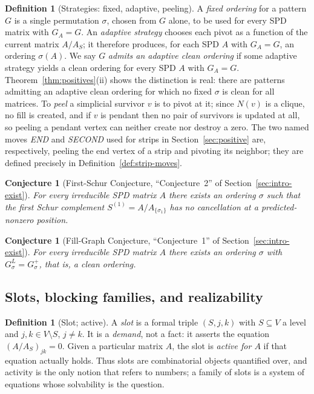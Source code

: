 \documentclass[11pt]{article}
\theoremstyle{plain}
\newtheorem{conjecture}[theorem]{Conjecture}
\theoremstyle{definition}
\newtheorem{definition}[theorem]{Definition}
\begin{document}
\begin{aiblock}
\begin{definition}[Strategies: fixed, adaptive, peeling]\label{def:strategy}
A \emph{fixed ordering} for a pattern $G$ is a single permutation $\sigma$, chosen from $G$ alone, to
be used for every SPD matrix with $G_A=G$. An \emph{adaptive strategy} chooses each pivot as a
function of the current matrix $A/A_S$; it therefore produces, for each SPD $A$ with $G_A=G$, an
ordering $\sigma(A)$. We say $G$ \emph{admits an adaptive clean ordering} if some adaptive strategy
yields a clean ordering for every SPD $A$ with $G_A=G$. Theorem~\ref{thm:positives}(ii) shows the
distinction is real: there are patterns admitting an adaptive clean ordering for which no fixed
$\sigma$ is clean for all matrices. To \emph{peel} a simplicial survivor $v$ is to pivot at it; since
$N(v)$ is a clique, no fill is created, and if $v$ is pendant then no pair of survivors is updated at
all, so peeling a pendant vertex can neither create nor destroy a zero. The two named moves
\emph{END} and \emph{SECOND} used for strips in Section~\ref{sec:positive} are, respectively, peeling
the end vertex of a strip and pivoting its neighbor; they are defined precisely in
Definition~\ref{def:strip-moves}.
\end{definition}

\begin{conjecture}[First-Schur Conjecture, ``Conjecture~2'' of Section~\ref{sec:intro-exist}]\label{conj:2}
For every irreducible SPD matrix $A$ there exists an ordering $\sigma$ such that the first Schur
complement $S^{(1)}=A/A_{\{\sigma_1\}}$ has no cancellation at a predicted-nonzero position.
\end{conjecture}

\begin{conjecture}[Fill-Graph Conjecture, ``Conjecture~1'' of Section~\ref{sec:intro-exist}]\label{conj:1}
For every irreducible SPD matrix $A$ there exists an ordering $\sigma$ with $G^L_\sigma=G^+_\sigma$,
that is, a clean ordering.
\end{conjecture}

\subsection{Slots, blocking families, and realizability}

\begin{definition}[Slot; active]\label{def:slots}
A \emph{slot} is a formal triple $(S,j,k)$ with $S\subseteq V$ a level and $j,k\in V\setminus S$,
$j\neq k$. It is a \emph{demand}, not a fact: it asserts the equation $(A/A_S)_{jk}=0$. Given a
particular matrix $A$, the slot is \emph{active for $A$} if that equation actually holds. Thus slots
are combinatorial objects quantified over, and activity is the only notion that refers to numbers; a
family of slots is a system of equations whose solvability is the question.
\end{definition}


\end{aiblock}
\end{document}
